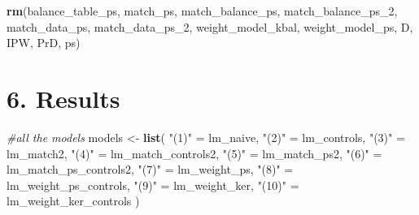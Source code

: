 \documentclass[
]{article}
\newenvironment{Shaded}{\begin{snugshade}}{\end{snugshade}}
\newcommand{\CommentTok}[1]{\textcolor[rgb]{0.56,0.35,0.01}{\textit{#1}}}
\newcommand{\FunctionTok}[1]{\textcolor[rgb]{0.13,0.29,0.53}{\textbf{#1}}}
\newcommand{\NormalTok}[1]{#1}
\newcommand{\OtherTok}[1]{\textcolor[rgb]{0.56,0.35,0.01}{#1}}
\newcommand{\StringTok}[1]{\textcolor[rgb]{0.31,0.60,0.02}{#1}}
\begin{document}
\begin{Shaded}
\begin{Highlighting}[]
\FunctionTok{rm}\NormalTok{(balance\_table\_ps, match\_ps, match\_balance\_ps, match\_balance\_ps\_2, match\_data\_ps, match\_data\_ps\_2, weight\_model\_kbal, weight\_model\_ps, D, IPW, PrD, ps)}
\end{Highlighting}
\end{Shaded}

\section{6. Results}\label{results}

\begin{Shaded}
\begin{Highlighting}[]
\CommentTok{\#all the models}
\NormalTok{models }\OtherTok{\textless{}{-}} \FunctionTok{list}\NormalTok{(}
  \StringTok{"(1)"} \OtherTok{=}\NormalTok{ lm\_naive,}
  \StringTok{"(2)"} \OtherTok{=}\NormalTok{ lm\_controls,}
  \StringTok{"(3)"} \OtherTok{=}\NormalTok{ lm\_match2,}
  \StringTok{"(4)"} \OtherTok{=}\NormalTok{ lm\_match\_controls2,}
  \StringTok{"(5)"} \OtherTok{=}\NormalTok{ lm\_match\_ps2,}
  \StringTok{"(6)"} \OtherTok{=}\NormalTok{ lm\_match\_ps\_controls2,}
  \StringTok{"(7)"} \OtherTok{=}\NormalTok{ lm\_weight\_ps,}
  \StringTok{"(8)"} \OtherTok{=}\NormalTok{ lm\_weight\_ps\_controls,}
  \StringTok{"(9)"} \OtherTok{=}\NormalTok{ lm\_weight\_ker,}
  \StringTok{"(10)"} \OtherTok{=}\NormalTok{ lm\_weight\_ker\_controls}
\NormalTok{  )}


\end{Highlighting}
\end{Shaded}
\end{document}
